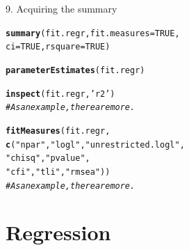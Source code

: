 \documentclass[10pt]{beamer}\usepackage[]{graphicx}\usepackage[]{xcolor}
\makeatletter
\newcommand{\hlnum}[1]{\textcolor[rgb]{0.686,0.059,0.569}{#1}}%
\newcommand{\hlstr}[1]{\textcolor[rgb]{0.192,0.494,0.8}{#1}}%
\newcommand{\hlcom}[1]{\textcolor[rgb]{0.678,0.584,0.686}{\textit{#1}}}%
\newcommand{\hlstd}[1]{\textcolor[rgb]{0.345,0.345,0.345}{#1}}%
\newcommand{\hlkwc}[1]{\textcolor[rgb]{0.333,0.667,0.333}{#1}}%
\newcommand{\hlkwd}[1]{\textcolor[rgb]{0.737,0.353,0.396}{\textbf{#1}}}%
\newenvironment{kframe}{%
 \def\at@end@of@kframe{}%
 \ifinner\ifhmode%
  \def\at@end@of@kframe{\end{minipage}}%
  \begin{minipage}{\columnwidth}%
 \fi\fi%
 \def\FrameCommand##1{\hskip\@totalleftmargin \hskip-\fboxsep
 \colorbox{shadecolor}{##1}\hskip-\fboxsep
     \hskip-\linewidth \hskip-\@totalleftmargin \hskip\columnwidth}%
 \MakeFramed {\advance\hsize-\width
   \@totalleftmargin\z@ \linewidth\hsize
   \@setminipage}}%
 {\par\unskip\endMakeFramed%
 \at@end@of@kframe}
\newenvironment{knitrout}{}{} %
\makeatother
\begin{document}
\begin{frame}[fragile]{9. Acquiring the summary}

\begin{knitrout}
\color{fgcolor}\begin{kframe}
\begin{alltt}
\hlkwd{summary}\hlstd{(fit.regr,} \hlkwc{fit.measures} \hlstd{=} \hlnum{TRUE}\hlstd{,}
        \hlkwc{ci} \hlstd{=} \hlnum{TRUE}\hlstd{,} \hlkwc{rsquare} \hlstd{=} \hlnum{TRUE}\hlstd{)}
\end{alltt}
\end{kframe}
\end{knitrout}

\begin{knitrout}
\color{fgcolor}\begin{kframe}
\begin{alltt}
\hlkwd{parameterEstimates}\hlstd{(fit.regr)}

\hlkwd{inspect}\hlstd{(fit.regr,} \hlstr{'r2'}\hlstd{)}
\hlcom{# As an example, there are more.}

\hlkwd{fitMeasures}\hlstd{(fit.regr,}
            \hlkwd{c}\hlstd{(}\hlstr{"npar"}\hlstd{,} \hlstr{"logl"}\hlstd{,} \hlstr{"unrestricted.logl"}\hlstd{,}
              \hlstr{"chisq"}\hlstd{,} \hlstr{"pvalue"}\hlstd{,}
              \hlstr{"cfi"}\hlstd{,} \hlstr{"tli"}\hlstd{,} \hlstr{"rmsea"}\hlstd{))}
\hlcom{# As an example, there are more.}
\end{alltt}
\end{kframe}
\end{knitrout}

\end{frame}
%
\section{Regression}
\end{document}
